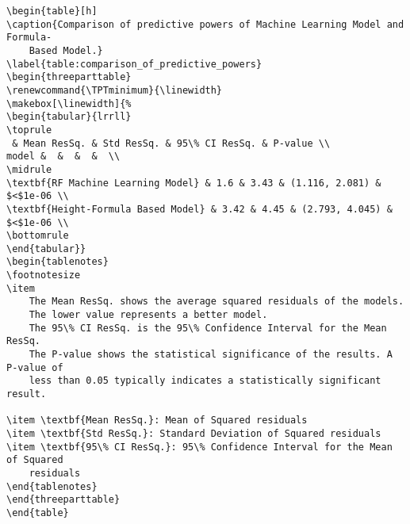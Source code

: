 \documentclass[11pt]{article}
\begin{document}
\begin{Verbatim}[tabsize=4]
\begin{table}[h]
\caption{Comparison of predictive powers of Machine Learning Model and Formula-
	Based Model.}
\label{table:comparison_of_predictive_powers}
\begin{threeparttable}
\renewcommand{\TPTminimum}{\linewidth}
\makebox[\linewidth]{%
\begin{tabular}{lrrll}
\toprule
 & Mean ResSq. & Std ResSq. & 95\% CI ResSq. & P-value \\
model &  &  &  &  \\
\midrule
\textbf{RF Machine Learning Model} & 1.6 & 3.43 & (1.116, 2.081) & $<$1e-06 \\
\textbf{Height-Formula Based Model} & 3.42 & 4.45 & (2.793, 4.045) & $<$1e-06 \\
\bottomrule
\end{tabular}}
\begin{tablenotes}
\footnotesize
\item
    The Mean ResSq. shows the average squared residuals of the models.
    The lower value represents a better model.
    The 95\% CI ResSq. is the 95\% Confidence Interval for the Mean ResSq.
    The P-value shows the statistical significance of the results. A P-value of
	less than 0.05 typically indicates a statistically significant result.

\item \textbf{Mean ResSq.}: Mean of Squared residuals
\item \textbf{Std ResSq.}: Standard Deviation of Squared residuals
\item \textbf{95\% CI ResSq.}: 95\% Confidence Interval for the Mean of Squared
	residuals
\end{tablenotes}
\end{threeparttable}
\end{table}

\end{Verbatim}
\end{document}
